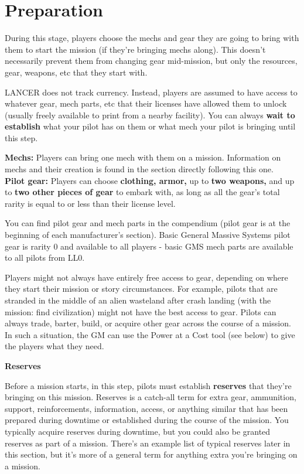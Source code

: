 \section{Preparation}

During this stage, players choose the mechs and gear they are going to bring with them to start the mission (if they’re bringing mechs along). This doesn’t necessarily prevent them from changing gear mid-mission, but only the resources, gear, weapons, etc that they start with.

LANCER does not track currency. Instead, players are assumed to have access to whatever gear, mech parts, etc that their licenses have allowed them to unlock (usually freely available to print from a nearby facility). You can always \textbf{wait to establish} what your pilot has on them or what mech your pilot is bringing until this step.

\textbf{Mechs:} Players can bring one mech with them on a mission. Information on mechs and their creation is found in the section directly following this one.\\
\textbf{Pilot gear:} Players can choose \textbf{clothing, armor,} up to \textbf{two weapons,} and up to \textbf{two other pieces of gear} to embark with, as long as all the gear’s total rarity is equal to or less than their license level.

You can find pilot gear and mech parts in the compendium (pilot gear is at the beginning of each manufacturer’s section). Basic General Massive Systems pilot gear is rarity 0 and available to all players - basic GMS mech parts are available to all pilots from LL0.

Players might not always have entirely free access to gear, depending on where they start their mission or story circumstances. For example, pilots that are stranded in the middle of an alien wasteland after crash landing (with the mission: find civilization) might not have the best access to gear. Pilots can always trade, barter, build, or acquire other gear across the course of a mission. In such a situation, the GM can use the Power at a Cost tool (see below) to give the
players what they need.

                                                   \textbf{Reserves} 

Before a mission starts, in this step, pilots must establish \textbf{reserves} that they’re bringing on this mission. Reserves is a catch-all term for extra gear, ammunition, support, reinforcements, information, access, or anything similar that has been prepared during downtime or established during the course of the mission. You typically acquire reserves during downtime, but you could also be granted reserves as part of a mission. There’s an example list of typical reserves later in this section, but it’s more of a general term for anything extra you’re bringing on a mission.
